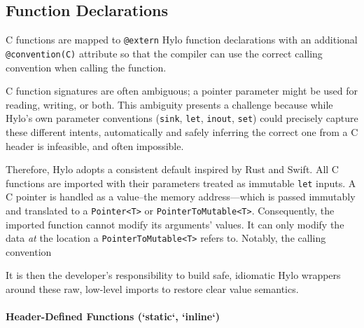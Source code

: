\subsection{Function Declarations}
C functions are mapped to \texttt{@extern} Hylo function declarations with an additional \texttt{@convention(C)} attribute so that the compiler can use the correct calling convention when calling the function.

C function signatures are often ambiguous; a pointer parameter might be used for reading, writing, or both. This ambiguity presents a challenge because while Hylo's own parameter conventions (\texttt{sink}, \texttt{let}, \texttt{inout}, \texttt{set}) could precisely capture these different intents, automatically and safely inferring the correct one from a C header is infeasible, and often impossible.

Therefore, Hylo adopts a consistent default inspired by Rust and Swift. All C functions are imported with their parameters treated as immutable \texttt{let} inputs. A C pointer is handled as a value--the memory address—which is passed immutably and translated to a \texttt{Pointer<T>} or \texttt{PointerToMutable<T>}. Consequently, the imported function cannot modify its arguments' values. It can only modify the data \textit{at} the location a \texttt{PointerToMutable<T>} refers to. Notably, the calling convention 

It is then the developer's responsibility to build safe, idiomatic Hylo wrappers around these raw, low-level imports to restore clear value semantics.

\paragraph{Header-Defined Functions (`static`, `inline`)}
\label{handling_inline_c_functions}

